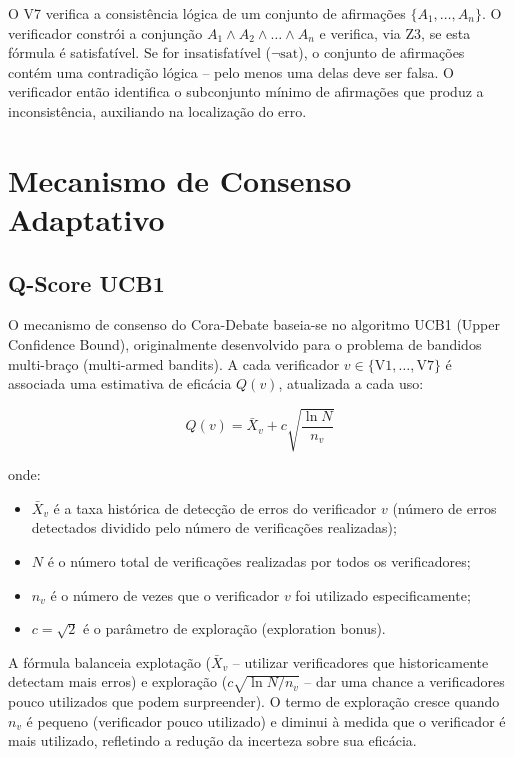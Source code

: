 \documentclass[12pt,a4paper,sumario=tradicional,openany]{abntex2}
\begin{document}
O V7 verifica a consistência lógica de um conjunto de afirmações $\{A_1, \ldots, A_n\}$. O verificador constrói a conjunção $A_1 \land A_2 \land \ldots \land A_n$ e verifica, via Z3, se esta fórmula é satisfatível. Se for insatisfatível ($\neg\text{sat}$), o conjunto de afirmações contém uma contradição lógica -- pelo menos uma delas deve ser falsa. O verificador então identifica o subconjunto mínimo de afirmações que produz a inconsistência, auxiliando na localização do erro.

\section{Mecanismo de Consenso Adaptativo}

\subsection{Q-Score UCB1}

O mecanismo de consenso do Cora-Debate baseia-se no algoritmo UCB1 (Upper Confidence Bound), originalmente desenvolvido para o problema de bandidos multi-braço (multi-armed bandits). A cada verificador $v \in \{\text{V1}, \ldots, \text{V7}\}$ é associada uma estimativa de eficácia $Q(v)$, atualizada a cada uso:

\begin{equation}
Q(v) = \bar{X}_v + c \sqrt{\frac{\ln N}{n_v}}
\end{equation}

onde:
\begin{itemize}
    \item $\bar{X}_v$ é a taxa histórica de detecção de erros do verificador $v$ (número de erros detectados dividido pelo número de verificações realizadas);
    \item $N$ é o número total de verificações realizadas por todos os verificadores;
    \item $n_v$ é o número de vezes que o verificador $v$ foi utilizado especificamente;
    \item $c = \sqrt{2}$ é o parâmetro de exploração (exploration bonus).
\end{itemize}

A fórmula balanceia explotação ($\bar{X}_v$ -- utilizar verificadores que historicamente detectam mais erros) e exploração ($c \sqrt{\ln N / n_v}$ -- dar uma chance a verificadores pouco utilizados que podem surpreender). O termo de exploração cresce quando $n_v$ é pequeno (verificador pouco utilizado) e diminui à medida que o verificador é mais utilizado, refletindo a redução da incerteza sobre sua eficácia.
\end{document}
